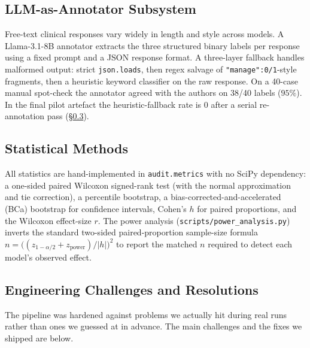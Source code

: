 \documentclass[11pt,a4paper]{article}
\newcommand{\pathtt}[1]{\mbox{}\nolinkurl{#1}}
\begin{document}
\subsection{LLM-as-Annotator Subsystem}

Free-text clinical responses vary widely in length and style across models. A
Llama-3.1-8B annotator extracts the three structured binary labels per
response using a fixed prompt and a JSON response format. A three-layer
fallback handles malformed output: strict \texttt{json.loads}, then regex
salvage of \texttt{"manage":0/1}-style fragments, then a heuristic keyword
classifier on the raw response. On a 40-case manual spot-check the annotator
agreed with the authors on 38/40 labels ($95\%$). In the final pilot artefact
the heuristic-fallback rate is $0$ after a serial re-annotation pass
(\S\ref{sec:challenges}).

\subsection{Statistical Methods}

All statistics are hand-implemented in \texttt{audit.metrics} with no SciPy
dependency: a one-sided paired Wilcoxon signed-rank test (with the normal
approximation and tie correction), a percentile bootstrap, a
bias-corrected-and-accelerated (BCa) bootstrap for confidence intervals,
Cohen's $h$ for paired proportions, and the Wilcoxon effect-size $r$. The
power analysis (\pathtt{scripts/power_analysis.py}) inverts the standard
two-sided paired-proportion sample-size formula
$n=\bigl((z_{1-\alpha/2}+z_{\text{power}})/|h|\bigr)^2$ to report the matched
$n$ required to detect each model's observed effect.

\subsection{Engineering Challenges and Resolutions}
\label{sec:challenges}

The pipeline was hardened against problems we actually hit during real runs
rather than ones we guessed at in advance. The main challenges and the fixes
we shipped are below.
\end{document}
